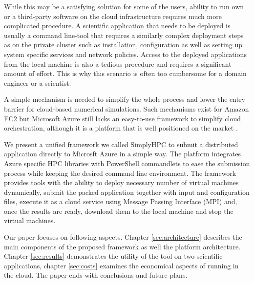 \documentclass[3p,times]{elsarticle}
\begin{document}
While this may be a satisfying solution for some of the users, ability to run own or a third-party software on the cloud infrastructure requires much more complicated procedure. A scientific application that needs to be deployed is usually a command line-tool that requires a similarly complex deployment steps as on the private cluster such as installation, configuration as well as setting up system specific services and network policies. Access to the deployed applications from the local machine is also a tedious procedure and requires a significant amount of effort. This is why this scenario is often too cumbersome for a domain engineer or a scientist.  

A simple mechanism is needed to simplify the whole process and lower the entry barrier for cloud-based numerical simulations. Such mechanisms exist for Amazon EC2 \cite{ec2} \cite{eucalyptus} but Microsoft Azure still lacks an easy-to-use framework to simplify cloud  orchestration, although it is a platform that is well positioned on the market \cite{Garg2013}.

We present a unified framework we called SimplyHPC to submit a distributed application directly to Microsft Azure in a simple way. The platform integrates Azure specific HPC libraries with PowerShell commandlets to ease the submission process while keeping the desired command line environment. The framework provides tools with the ability to deploy necessary number of virtual machines dynamically, submit the packed application together with input and configuration files, execute it as a cloud service using Message Passing Interface (MPI) and, once the results are ready, download them to the local machine and stop the virtual machines. 

Our paper focuses on following aspects. Chapter \ref{sec:architecture} describes the main components of the proposed framework as well the platform architecture. Chapter \ref{sec:results} demonstrates the utility of the tool on two scientific applications, chapter \ref{sec:costs} examines the economical aspects of running in the cloud. The paper ends with conclusions and future plans.

\end{document}
